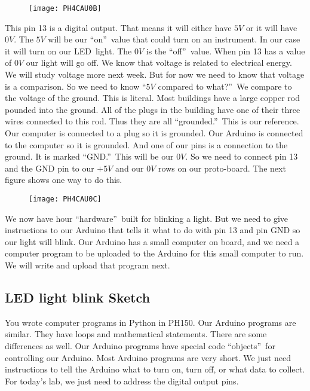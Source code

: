 \begin{figure}[h!]
	\centering
	\texttt{[image: PH4CAU0B]}
\end{figure}

This pin 13 is a digital output.
That means it will either have $5\unit{V}$ or it will have $0\unit{V}.$ The $%
5\unit{V}$ will be our \textquotedblleft on\textquotedblright\ value that
could turn on an instrument. In our case it will turn on our LED\ light. The 
$0\unit{V}$ is the \textquotedblleft off\textquotedblright\ value. When pin
13 has a value of $0\unit{V}$ our light will go off. We know that voltage is
related to electrical energy. We will study voltage more next week. But for
now we need to know that voltage is a comparison. So we need to know
\textquotedblleft $5\unit{V}$ compared to what?\textquotedblright\ We
compare to the voltage of the ground. This is literal. Most buildings have a
large copper rod pounded into the ground. All of the plugs in the building
have one of their three wires connected to this rod. Thus they are all
\textquotedblleft grounded.\textquotedblright\ This is our reference. Our
computer is connected to a plug so it is grounded. Our Arduino is connected
to the computer so it is grounded. And one of our pins is a connection to
the ground. It is marked \textquotedblleft GND.\textquotedblright\ This will
be our $0\unit{V}.$ So we need to connect pin 13 and the GND pin to our $+5%
\unit{V}$ and our $0\unit{V}$ rows on our proto-board. The next figure shows
one way to do this.

\begin{figure}[h!]
	\centering
	\texttt{[image: PH4CAU0C]}
\end{figure}

We now have hour \textquotedblleft hardware\textquotedblright\ built for
blinking a light. But we need to give instructions to our Arduino that tells
it what to do with pin 13 and pin GND so our light will blink. Our Arduino
has a small computer on board, and we need a computer program to be uploaded
to the Arduino for this small computer to run. We will write and upload that
program next.

\subsection{LED light blink Sketch}

You wrote computer programs in Python in PH150. Our Arduino programs are
similar. They have loops and mathematical statements. There are some
differences as well. Our Arduino programs have special code
\textquotedblleft objects\textquotedblright\ for controlling our Arduino.
Most Arduino programs are very short. We just need instructions to tell the
Arduino what to turn on, turn off, or what data to collect. For today's lab,
we just need to address the digital output pins.

